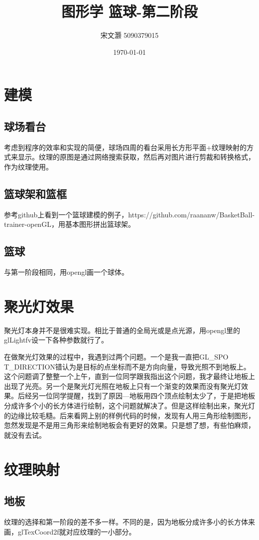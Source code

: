 \documentclass[10pt,a4paper]{article}
\begin{document}
\title{图形学 篮球-第二阶段}
\author{宋文灏 5090379015}
\date{\today}
\maketitle
\section{建模}
\subsection{球场看台}
考虑到程序的效率和实现的简便，球场四周的看台采用长方形平面+纹理映射的方式来显示。纹理的原图是通过网络搜索获取，然后再对图片进行剪裁和转换格式，作为纹理使用。
\subsection{篮球架和篮框}
参考github上看到一个篮球建模的例子，https://github.com/raananw/BasketBall-trainer-openGL，用基本图形拼出篮球架。
\subsection{篮球}
与第一阶段相同，用opengl画一个球体。

\section{聚光灯效果}
聚光灯本身并不是很难实现。相比于普通的全局光或是点光源，用opengl里的glLightfv设一下各种参数就行了。

在做聚光灯效果的过程中，我遇到过两个问题。一个是我一直把GL\_SPO\\T\_DIRECTION错认为是目标的点坐标而不是方向向量，导致光照不到地板上。这个问题调了整整一个上午，直到一位同学跟我指出这个问题，我才最终让地板上出现了光亮。另一个是聚光灯光照在地板上只有一个渐变的效果而没有聚光灯效果。后经另一位同学提醒，找到了原因---地板用四个顶点绘制太少了，于是把地板分成许多个小的长方体进行绘制，这个问题就解决了。但是这样绘制出来，聚光灯的边缘比较毛糙。后来看网上别的样例代码的时候，发现有人用三角形绘制图形，忽然发现是不是用三角形来绘制地板会有更好的效果。只是想了想，有些怕麻烦，就没有去试。

\section{纹理映射}
\subsection{地板}
纹理的选择和第一阶段的差不多一样。不同的是，因为地板分成许多小的长方体来画，glTexCoord2f就对应纹理的一小部分。
\end{document}
